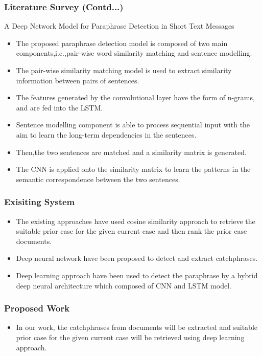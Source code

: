 \documentclass{beamer}
\begin{document}
\begin{frame}\frametitle{Literature Survey (Contd...)}
      A Deep Network Model for Paraphrase Detection in Short Text Messages\cite{agarwal2017deep}
	
	\begin{itemize}
		\item The proposed paraphrase detection model is composed of two main components,i.e.,pair-wise word similarity matching and sentence modelling.
		\item The pair-wise similarity matching model is used to extract similarity information between pairs of sentences.
		\item The features generated by the convolutional layer have the form of n-grams, and are fed into the LSTM.
		\item Sentence modelling component is able to process sequential input with the aim to learn the long-term dependencies
		in the sentences.
		\item Then,the two sentences are matched and a similarity matrix is generated.
		\item The CNN is applied onto the similarity matrix to learn the patterns in the semantic correspondence between the two
		sentences.         
	\end{itemize}
\end{frame}

\begin{frame}\frametitle{Exisiting System}
 \begin{itemize}
 	\item The existing approaches have used cosine similarity approach to retrieve the suitable prior case for the given current case and then rank the prior case documents\cite{reshma2017distributed}\cite{thenmozhi2017text}.
 	\item Deep neural network have been proposed to detect and extract catchphrases\cite{bhargava2017catchphrase}\cite{das2017catch}.
 	\item Deep learning approach have been used to detect the paraphrase by a hybrid deep neural architecture which composed of CNN and LSTM model\cite{agarwal2017deep}. 	
\end{itemize}
\end{frame}

\begin{frame}\frametitle{Proposed Work}
  
    \begin{itemize}
      \item In our work, the catchphrases from documents will be extracted and suitable prior case for the given current case will be retrieved using deep learning approach.

\end{itemize}
\end{frame}
\end{document}
